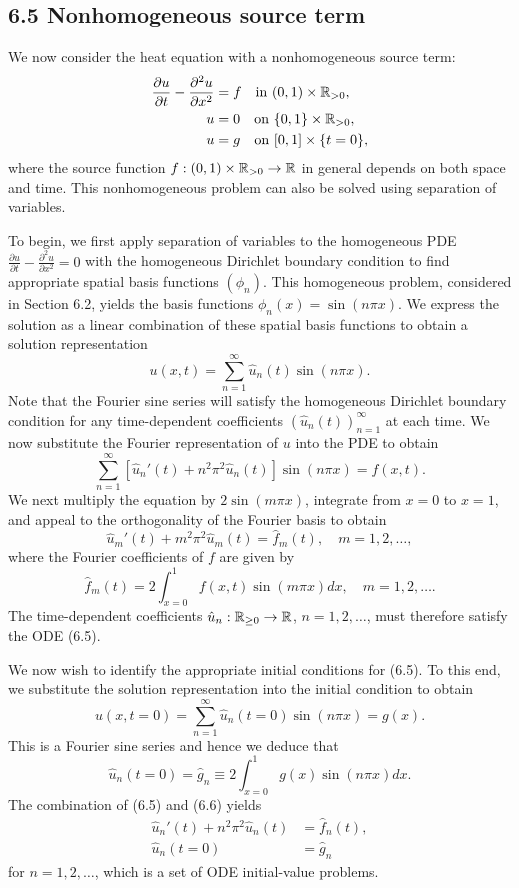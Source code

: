 \subsection{6.5 Nonhomogeneous source term}
We now consider the heat equation with a nonhomogeneous source term:
\begin{align*}
    \frac{\partial u}{\partial t} - \frac{\partial^2 u}{\partial x^2} &= f \quad \text{in } (0, 1) \times \mathbb{R}_{>0}, \\
    u &= 0 \quad \text{on } \{0, 1\} \times \mathbb{R}_{>0}, \\
    u &= g \quad \text{on } [0, 1] \times \{t = 0\},
\end{align*}
where the source function $f : (0, 1) \times \mathbb{R}_{>0} \to \mathbb{R}$ in general depends on both space and time. This nonhomogeneous problem can also be solved using separation of variables.

To begin, we first apply separation of variables to the homogeneous PDE $\frac{\partial u}{\partial t} - \frac{\partial^2 u}{\partial x^2} = 0$ with the homogeneous Dirichlet boundary condition to find appropriate spatial basis functions $(\phi_n)$. This homogeneous problem, considered in Section 6.2, yields the basis functions $\phi_n(x) = \sin(n\pi x)$. We express the solution as a linear combination of these spatial basis functions to obtain a solution representation
\[u(x, t) = \sum_{n=1}^{\infty} \hat{u}_n(t) \sin(n\pi x).\]
Note that the Fourier sine series will satisfy the homogeneous Dirichlet boundary condition for any time-dependent coefficients $(\hat{u}_n(t))_{n=1}^{\infty}$ at each time. We now substitute the Fourier representation of $u$ into the PDE to obtain
\[\sum_{n=1}^{\infty} [\hat{u}_n'(t) + n^2\pi^2 \hat{u}_n(t)] \sin(n\pi x) = f(x, t).\]
We next multiply the equation by $2\sin(m\pi x)$, integrate from $x = 0$ to $x = 1$, and appeal to the orthogonality of the Fourier basis to obtain
\begin{equation*}
    \hat{u}_m'(t) + m^2\pi^2 \hat{u}_m(t) = \hat{f}_m(t), \quad m = 1, 2, \dots, \tag{6.5}
\end{equation*}
where the Fourier coefficients of $f$ are given by
\[\hat{f}_m(t) = 2 \int_{x=0}^{1} f(x, t) \sin(m\pi x) dx, \quad m = 1, 2, \dots.\]
The time-dependent coefficients $\hat{u}_n : \mathbb{R}_{\geq 0} \to \mathbb{R}$, $n = 1, 2, \dots$, must therefore satisfy the ODE (6.5).

We now wish to identify the appropriate initial conditions for (6.5). To this end, we substitute the solution representation into the initial condition to obtain
\[u(x, t = 0) = \sum_{n=1}^{\infty} \hat{u}_n(t = 0) \sin(n\pi x) = g(x).\]
This is a Fourier sine series and hence we deduce that
\begin{equation*}
    \hat{u}_n(t = 0) = \hat{g}_n \equiv 2 \int_{x=0}^{1} g(x) \sin(n\pi x) dx. \tag{6.6}
\end{equation*}
The combination of (6.5) and (6.6) yields
\begin{align*}
    \hat{u}_n'(t) + n^2\pi^2 \hat{u}_n(t) &= \hat{f}_n(t), \\
    \hat{u}_n(t = 0) &= \hat{g}_n
\end{align*}
for $n = 1, 2, \dots$, which is a set of ODE initial-value problems.

